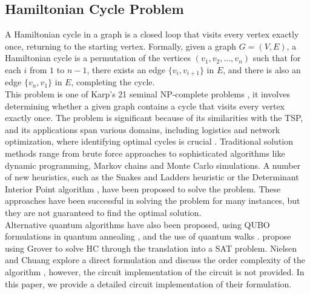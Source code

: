 \documentclass[10pt,a4paper]{article}
\begin{document}
\subsection{Hamiltonian Cycle Problem}
A Hamiltonian cycle in a graph is a closed loop that visits every vertex exactly once, returning to the starting vertex. Formally, given a graph $G = (V, E)$, a Hamiltonian cycle is a permutation of the vertices $(v_1, v_2, ..., v_n)$ such that for each $i$ from $1$ to $n-1$, there exists an edge $\{v_i, v_{i+1}\}$ in $E$, and there is also an edge $\{v_n, v_1\}$ in $E$, completing the cycle.\\
This problem is one of Karp's 21 seminal NP-complete problems \cite{Karp1972}, it involves determining whether a given graph contains a cycle that visits every vertex exactly once. The problem is significant because of its similarities with the TSP, and its applications span various domains, including logistics and network optimization, where identifying optimal cycles is crucial \cite{tsp, routing}. Traditional solution methods range from brute force approaches to sophisticated algorithms like dynamic programming\cite{dynamic}, Markov chains \cite{markov_chains} and Monte Carlo simulations\cite{monte_carlo}. 
A number of new heuristics, such as the Snakes and Ladders heuristic \cite{snakes} or the Determinant Interior Point algorithm \cite{determinant}, have been proposed to solve the problem. These approaches have been successful in solving the problem for many instances, but they are not guaranteed to find the optimal solution.\\
Alternative quantum algorithms have also been proposed, using QUBO formulations in quantum annealing \cite{Lucas_2014, quantum_hamiltonian, feld_hc}, and the use of quantum walks \cite{quantum_walks}. \cite{grover_sat_hc} propose using Grover to solve HC through the translation into a SAT problem. Nielsen and Chuang explore a direct formulation and discuss the order complexity of the algorithm \cite{Nielsen_Chuang_2010}, however, the circuit implementation of the circuit is not provided. In this paper, we provide a detailed circuit implementation of their formulation.\\
\end{document}
